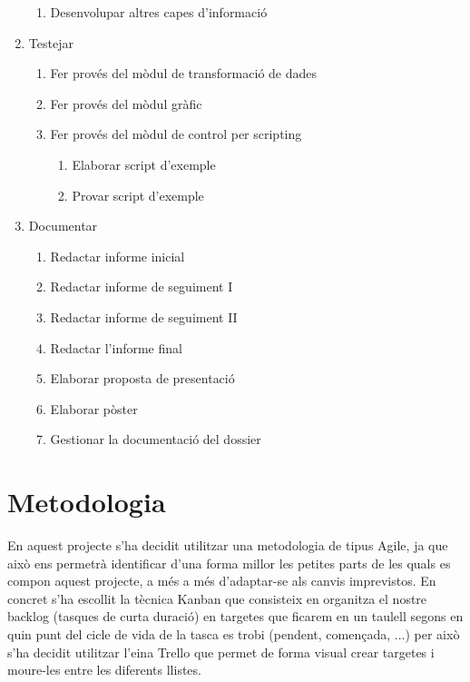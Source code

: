 \documentclass[10pt,a4paper,twocolumn,twoside]{article}
\begin{document}
\begin{enumerate}
\begin{enumerate}
  	\item Desenvolupar altres capes d'informació
  \end{enumerate}
  
  \item Testejar
  \begin{enumerate}
    \item Fer provés del mòdul de transformació de dades
    \item Fer provés del mòdul gràfic
    \item Fer provés del mòdul de control per scripting
    \begin{enumerate}
    	\item Elaborar script d'exemple
	    \item Provar script d'exemple
  	\end{enumerate}
  \end{enumerate}
  
  \item Documentar
  \begin{enumerate}
    \item Redactar informe inicial
    \item Redactar informe de seguiment I
    \item Redactar informe de seguiment II
    \item Redactar l'informe final
    \item Elaborar proposta de presentació
    \item Elaborar pòster
    \item Gestionar la documentació del dossier
  \end{enumerate}
  
\end{enumerate}

\section{Metodologia}

En aquest projecte s'ha decidit utilitzar una metodologia de tipus Agile\cite{agile}, ja que això ens permetrà identificar d'una forma millor les petites parts de les quals es compon aquest projecte, a més a més d'adaptar-se als canvis imprevistos. En concret s'ha escollit la tècnica Kanban\cite{kanban} que consisteix en organitza el nostre backlog (tasques de curta duració) en
targetes que ficarem en un taulell segons en quin punt del cicle de vida de la tasca es trobi (pendent, començada, ...) per això s'ha decidit utilitzar l'eina Trello\cite{trello} que permet de forma visual crear targetes i moure-les entre les diferents llistes.
\end{document}
